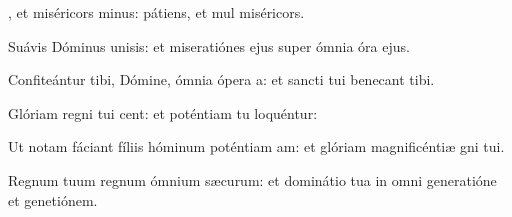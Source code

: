 \item {}, et miséricors minus:\psstar{} pátiens, et mul miséricors.

\item Suávis Dóminus unisis:\psstar{} et miseratiónes ejus super ómnia óra ejus.

\item Confiteántur tibi, Dómine, ómnia ópera a:\psstar{} et sancti tui benecant tibi.

\item Glóriam regni tui cent:\psstar{} et poténtiam tu loquéntur:

\item Ut notam fáciant fíliis hóminum poténtiam am:\psstar{} et glóriam magnificéntiæ gni tui.

\item Regnum tuum regnum ómnium sæcurum:\psstar{} et dominátio tua in omni generatióne et genetiónem.


